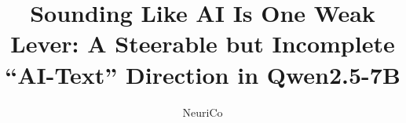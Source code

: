 \documentclass{article}
\title{Sounding Like AI Is One Weak Lever: A Steerable but Incomplete ``AI-Text'' Direction in Qwen2.5-7B}
\author{NeuriCo}
\begin{document}
\maketitle

\begin{abstract}

\end{abstract}










\appendix

\end{document}
